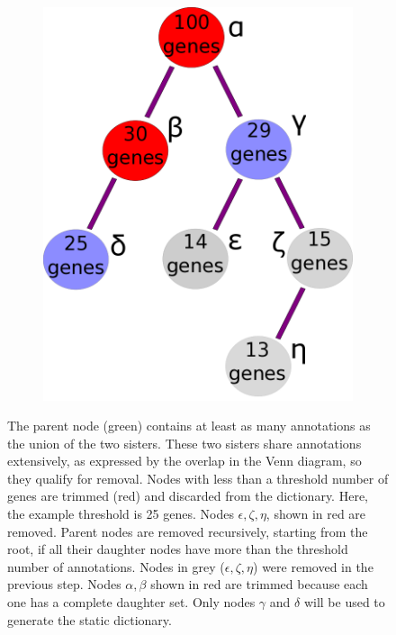 \documentclass{bmcart}
\begin{document}
\begin{backmatter}
\begin{figure}[h!]
\begin{subfigure}[b]{0.3\textwidth}
    \includegraphics[width=\textwidth]{figures/CeilingTrimmingOntogeny.png}
    	\caption{}
    \label{fig:trim_roots}
  \end{subfigure}

  \captionsetup{width= 0.95\textwidth}
  \caption{
     The parent node (green) contains at least as many annotations as the union of the two sisters. These two sisters share annotations extensively, as expressed by the overlap in the Venn diagram, so they qualify for removal. 	
	 Nodes with less than a threshold number of genes are trimmed (red) and discarded from the dictionary. Here, the example threshold is 25 genes. Nodes $\epsilon, \zeta, \eta$, shown in red are removed.
	 Parent nodes are removed recursively, starting from the root, if all their daughter nodes have more than the threshold number of annotations. Nodes in grey ($\epsilon, \zeta, \eta$) were removed in the previous step. Nodes $\alpha, \beta$ shown in red are trimmed because each one has a complete daughter set. Only nodes $\gamma$ and $\delta$ will be used to generate the static dictionary. 
  }
\end{figure}




\end{backmatter}
\end{document}
